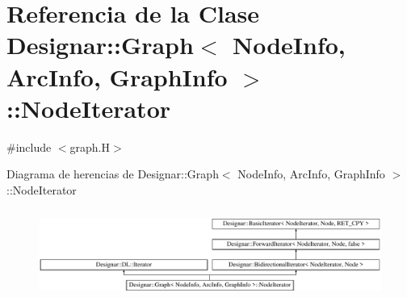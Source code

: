 \hypertarget{class_designar_1_1_graph_1_1_node_iterator}{}\section{Referencia de la Clase Designar\+:\+:Graph$<$ Node\+Info, Arc\+Info, Graph\+Info $>$\+:\+:Node\+Iterator}
\label{class_designar_1_1_graph_1_1_node_iterator}


{\ttfamily \#include $<$graph.\+H$>$}

Diagrama de herencias de Designar\+:\+:Graph$<$ Node\+Info, Arc\+Info, Graph\+Info $>$\+:\+:Node\+Iterator\begin{figure}[H]
\begin{center}
\leavevmode
\includegraphics[height=2.955145cm]{class_designar_1_1_graph_1_1_node_iterator}
\end{center}
\end{figure}

